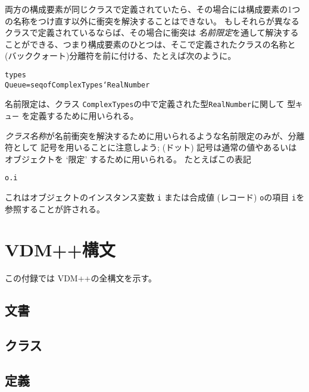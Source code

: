 \documentclass[\pformat,12pt]{jarticle}
\newcommand{\vdmpp}{VDM++}
\begin{document}
両方の構成要素が同じクラスで定義されていたら、その場合には構成要素の1つの名称をつけ直す以外に衝突を解決することはできない。
もしそれらが異なるクラスで定義されているならば、その場合に衝突は {\em 名前限定}を通して解決することができる、つまり構成要素のひとつは、そこで定義されたクラスの名称と (バッククォート)分離符を前に付ける、たとえば次のように。
  \begin{alltt}
    types
      Queue = seq of ComplexTypes`RealNumber
  \end{alltt}
名前限定は、クラス {\tt ComplexTypes}の中で定義された型{\tt RealNumber}に関して 型{\tt キュー} を定義するために用いられる。

{\em クラス名称}が名前衝突を解決するために用いられるような名前限定のみが、分離符として 記号を用いることに注意しよう; (ドット) 記号は通常の値やあるいはオブジェクトを `限定' するために用いられる。
たとえばこの表記
  \begin{alltt}
    o.i
  \end{alltt}
これはオブジェクトのインスタンス変数 {\tt i} または合成値 (レコード) {\tt o}の項目 {\tt i}を参照することが許される。


\newpage


%


\newpage
\appendix


\section{VDM++構文} \label{app-a}
この付録では \vdmpp の全構文を示す。
\subsection{文書}



\subsection{クラス}

\subsection{定義}
\end{document}
